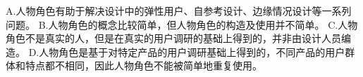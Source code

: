 \begin{solution}
A.人物角色有助于解决设计中的弹性用户、自参考设计、边缘情况设计等一系列问题。  B.人物角色的概念比较简单，但人物角色的构造及使用并不简单。  C.人物角色不是真实的人，但是在真实的用户调研的基础上得到的，并非由设计人员编造。  D.人物角色是基于对特定产品的用户调研基础上得到的，不同产品的用户群体和特点都不相同，因此人物角色不能被简单地重复使用。
\end{solution}